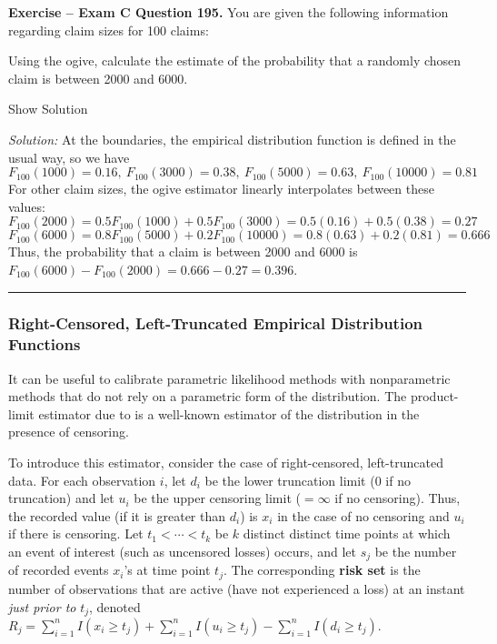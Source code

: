 \documentclass[]{book}
\theoremstyle{definition}
\theoremstyle{definition}
\theoremstyle{definition}
\theoremstyle{remark}
\begin{document}
\textbf{Exercise -- Exam C Question 195.} You are given the following
information regarding claim sizes for 100 claims:

Using the ogive, calculate the estimate of the probability that a
randomly chosen claim is between 2000 and 6000.

Show Solution

\hypertarget{toggleExamC195}{}
\emph{Solution:} At the boundaries, the empirical distribution function
is defined in the usual way, so we have
\[F_{100}(1000) = 0.16, \ F_{100}(3000)=0.38, \ F_{100}(5000)=0.63, \ F_{100}(10000)=0.81\]
For other claim sizes, the ogive estimator linearly interpolates between
these values:
\[F_{100}(2000) = 0.5F_{100}(1000) + 0.5F_{100}(3000) = 0.5(0.16)+0.5(0.38)=0.27\]
\[F_{100}(6000)=0.8F_{100}(5000)+0.2F_{100}(10000) = 0.8(0.63)+0.2(0.81)=0.666\]
Thus, the probability that a claim is between 2000 and 6000 is
\(F_{100}(6000) - F_{100}(2000) = 0.666-0.27 = 0.396\).

\begin{center}\rule{0.5\linewidth}{\linethickness}\end{center}

\subsubsection{Right-Censored, Left-Truncated Empirical Distribution
Functions}\label{right-censored-left-truncated-empirical-distribution-functions}

It can be useful to calibrate parametric likelihood methods with
nonparametric methods that do not rely on a parametric form of the
distribution. The product-limit estimator due to \citep{kaplan1958} is a
well-known estimator of the distribution in the presence of censoring.

To introduce this estimator, consider the case of right-censored,
left-truncated data. For each observation \(i\), let \(d_i\) be the
lower truncation limit (0 if no truncation) and let \(u_i\) be the upper
censoring limit (\(=\infty\) if no censoring). Thus, the recorded value
(if it is greater than \(d_i\)) is \(x_i\) in the case of no censoring
and \(u_i\) if there is censoring. Let \(t_{1} <\cdots< t_{k}\) be \(k\)
distinct distinct time points at which an event of interest (such as
uncensored losses) occurs, and let \(s_j\) be the number of recorded
events \(x_i\)'s at time point \(t_{j}\). The corresponding \textbf{risk
set} is the number of observations that are active (have not experienced
a loss) at an instant \emph{just prior to} \(t_{j}\), denoted
\(R_j = \sum_{i=1}^n I(x_i \geq t_{j}) + \sum_{i=1}^n I(u_i \geq t_{j}) - \sum_{i=1}^n I(d_i \geq t_{j})\).
\end{document}
